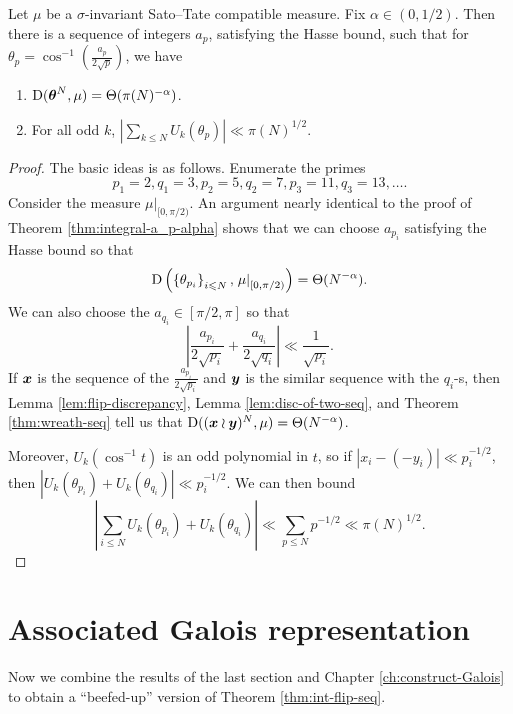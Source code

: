 \begin{theorem}\label{thm:int-flip-seq}
Let $\mu$ be a $\sigma$-invariant Sato--Tate compatible measure. Fix 
$\alpha\in (0,1/2)$. Then there is a sequence of integers $a_p$, satisfying 
the Hasse bound, such that for 
$\theta_p =\cos^{-1}\left( \frac{a_p}{2\sqrt p}\right)$, we have
\begin{enumerate}
\item
$\operatorname{D}({\boldsymbol\theta}^N,\mu) = \Theta(\pi(N)^{-\alpha})$. 

\item
For all odd $k$, 
$\left| \sum_{k\leqslant N} U_k(\theta_p)\right| \ll \pi(N)^{1/2}$. 
\end{enumerate}
\end{theorem}
\begin{proof}
The basic ideas is as follows. Enumerate the primes 
\[
	p_1 = 2, q_1 = 3, p_2 = 5, q_2 = 7, p_3 = 11, q_3 = 13, \dots .
\]
Consider the measure $\left.\mu\right|_{[0,\pi/2)}$. An argument 
nearly identical to the proof of Theorem \ref{thm:integral-a_p-alpha} shows 
that we can choose $a_{p_i}$ satisfying the Hasse bound so that 
\[
	\operatorname{D}\left( \left\{\theta_{p_i}\right\}_{i\leqslant N},\left.\mu\right|_{[0,\pi/2)}\right) = \Theta(N^{-\alpha}) .
\]
We can also choose the $a_{q_i}\in [\pi/2,\pi]$ so that 
\[
	\left| \frac{a_{p_i}}{2\sqrt{p_i}} + \frac{a_{q_i}}{2\sqrt{q_i}}\right| \ll \frac{1}{\sqrt{p_i}} .
\]
If ${\boldsymbol x}$ is the sequence of the $\frac{a_{p_i}}{2\sqrt{p_i}}$ and ${\boldsymbol y}$ is 
the similar sequence with the $q_i$-s, then Lemma \ref{lem:flip-discrepancy}, 
Lemma \ref{lem:disc-of-two-seq}, and Theorem \ref{thm:wreath-seq} tell us 
that $\operatorname{D}(({\boldsymbol x}\wr{\boldsymbol y})^N,\mu) = \Theta(N^{-\alpha})$. 

Moreover, $U_k(\cos^{-1} t)$ is an odd polynomial in $t$, so if 
$|x_i - (-y_i)| \ll p_i^{-1/2}$, then 
$|U_k(\theta_{p_i}) + U_k(\theta_{q_i})| \ll p_i^{-1/2}$. We can then bound 
\[
	\left| \sum_{i\leqslant N} U_k(\theta_{p_i}) + U_k(\theta_{q_i})\right| \ll \sum_{p\leqslant N} p^{-1/2} \ll \pi(N)^{1/2} .
\]
\end{proof}





\section{Associated Galois representation}

Now we combine the results of the last section and Chapter 
\ref{ch:construct-Galois} to obtain a ``beefed-up'' version of Theorem 
\ref{thm:int-flip-seq}. 

